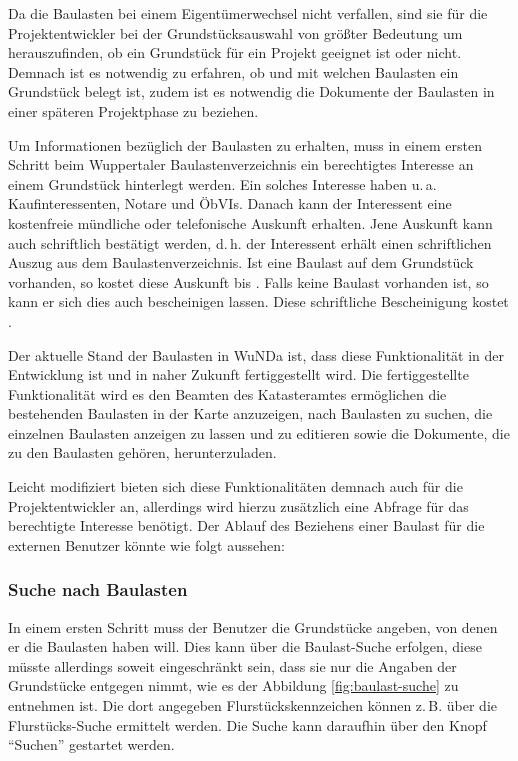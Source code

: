Da die Baulasten bei einem Eigentümerwechsel nicht verfallen, sind sie für die Projektentwickler bei der Grundstücksauswahl von größter Bedeutung um herauszufinden, ob ein Grundstück für ein Projekt geeignet ist oder nicht.
Demnach ist es notwendig zu erfahren, ob und mit welchen Baulasten ein Grundstück belegt ist, zudem ist es notwendig die Dokumente der Baulasten in einer späteren Projektphase zu beziehen.

Um Informationen bezüglich der Baulasten zu erhalten, muss in einem ersten Schritt beim  Wuppertaler Baulastenverzeichnis ein berechtigtes Interesse an einem Grundstück hinterlegt werden.
Ein solches Interesse haben u.\,a. Kaufinteressenten, Notare und \acp{ÖbVI}.
Danach kann der Interessent eine kostenfreie mündliche oder telefonische Auskunft erhalten.
Jene Auskunft kann auch schriftlich bestätigt werden, d.\,h. der Interessent erhält einen schriftlichen Auszug  aus dem Baulastenverzeichnis.
Ist eine Baulast auf dem Grundstück vorhanden, so kostet diese Auskunft  bis .
Falls keine Baulast vorhanden ist, so kann er sich dies auch bescheinigen lassen. Diese schriftliche Bescheinigung kostet  \autocite[vgl.][]{wupp-baulast}.

Der aktuelle Stand der Baulasten in \ac{WuNDa} ist, dass diese Funktionalität in der Entwicklung ist und in naher Zukunft fertiggestellt wird.
Die fertiggestellte Funktionalität wird es den Beamten des Katasteramtes ermöglichen die bestehenden Baulasten in der Karte anzuzeigen, nach Baulasten zu suchen, die einzelnen Baulasten anzeigen zu lassen und zu editieren sowie die Dokumente, die zu den Baulasten gehören, herunterzuladen.

Leicht modifiziert bieten sich diese Funktionalitäten demnach auch für die Projektentwickler an, allerdings wird hierzu zusätzlich eine Abfrage für das berechtigte Interesse benötigt.
Der Ablauf des Beziehens einer Baulast für die externen Benutzer könnte wie folgt aussehen:
\subsubsection{Suche nach Baulasten}
In einem ersten Schritt muss der Benutzer die Grundstücke angeben, von denen er die Baulasten haben will.
Dies kann über die Baulast-Suche erfolgen, diese müsste allerdings soweit eingeschränkt sein, dass sie nur die Angaben der Grundstücke entgegen nimmt, wie es der Abbildung \ref{fig:baulast-suche} zu entnehmen ist.
Die dort angegeben Flurstückskennzeichen können z.\,B. über die Flurstücks-Suche ermittelt werden.
Die Suche kann daraufhin über den Knopf \enquote{Suchen} gestartet werden.

